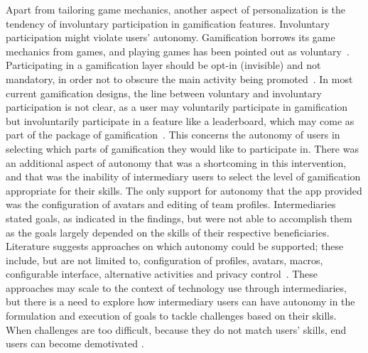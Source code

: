 Apart from tailoring game mechanics, another aspect of personalization is  the tendency of involuntary participation in gamification features. Involuntary participation might violate users' autonomy. Gamification borrows its game mechanics from games, and playing games has been pointed out as voluntary~\citep{seaborn2015:gamification,knaving2013designing}. Participating in a gamification layer should be opt-in (invisible) and not mandatory, in order not to obscure the main activity being promoted~\citep{knaving2013designing}. In most current gamification designs, the line between voluntary and involuntary participation is not clear, as a user may voluntarily participate in gamification but involuntarily participate in a feature like a leaderboard, which may come as part of the package of gamification~\citep{ferro2013towards}. This concerns the autonomy of users in selecting which parts of gamification they would like to participate in. There was an additional aspect of autonomy that was a shortcoming in this intervention, and that was the inability of intermediary users to select the level of gamification appropriate for their skills. The only support for autonomy that the app provided was the configuration of avatars and editing of team profiles. Intermediaries stated goals, as indicated in the findings, but were not able to accomplish them as the goals largely depended on the skills of their respective beneficiaries. Literature suggests approaches on which autonomy could be supported; these include, but are not limited to, configuration of profiles, avatars, macros, configurable interface, alternative activities and privacy control~\citep{francisco2012analysis}. These approaches may scale to the context of technology use through intermediaries, but there is a need to explore how intermediary users can have autonomy in the formulation and execution of goals to tackle challenges based on their skills. When challenges are too difficult, because they do not match users' skills, end users can become demotivated \citep{zhang2008motivational}.    

